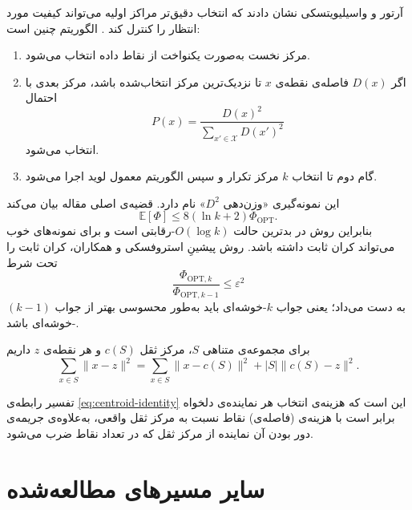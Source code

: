 آرتور و واسیلیویتسکی نشان دادند که انتخاب دقیق‌تر مراکز اولیه می‌تواند
کیفیت مورد انتظار  را کنترل کند \cite{arthur2007}. الگوریتم
 چنین است:
\begin{enumerate}
    \item مرکز نخست به‌صورت یکنواخت از نقاط داده انتخاب می‌شود.
    \item اگر $D(x)$ فاصله‌ی نقطه‌ی $x$ تا نزدیک‌ترین مرکز انتخاب‌شده باشد،
          مرکز بعدی با احتمال
          \begin{equation}
              P(x)=
              \frac{D(x)^2}{\sum_{x'\in\mathcal{X}}D(x')^2}
          \end{equation}
          انتخاب می‌شود.
    \item گام دوم تا انتخاب $k$ مرکز تکرار و سپس الگوریتم معمول لوید اجرا می‌شود.
\end{enumerate}
این نمونه‌گیری «وزن‌دهی $D^2$» نام دارد. قضیه‌ی اصلی مقاله بیان می‌کند
\begin{equation}
    \mathbb{E}[\Phi]\leq 8(\ln k+2)\Phi_{\mathrm{OPT}}.
    \label{eq:kpp-bound}
\end{equation}
بنابراین روش در بدترین حالت
$O(\log k)$-رقابتی است و برای نمونه‌های خوب می‌تواند کران ثابت
داشته باشد. روش پیشینِ استروفسکی و همکاران، کران ثابت را تحت شرط
\begin{equation}
    \frac{\Phi_{\mathrm{OPT},k}}
    {\Phi_{\mathrm{OPT},k-1}}\leq\varepsilon^2
\end{equation}
به دست می‌داد؛ یعنی جواب $k$-خوشه‌ای باید به‌طور محسوسی بهتر از جواب
$(k-1)$-خوشه‌ای باشد.

\begin{lemma}
    برای مجموعه‌ی متناهی $S$، مرکز ثقل $c(S)$ و هر نقطه‌ی $z$ داریم
    \begin{equation}
        \sum_{x\in S}\lVert x-z\rVert^2
        =
        \sum_{x\in S}\lVert x-c(S)\rVert^2
        +|S|\lVert c(S)-z\rVert^2.
        \label{eq:centroid-identity}
    \end{equation}
\end{lemma}

تفسیر رابطه‌ی \ref{eq:centroid-identity} این است که هزینه‌ی انتخاب هر
نماینده‌ی دلخواه برابر است با هزینه‌ی (فاصله‌ی) نقاط نسبت به مرکز ثقل واقعی،
به‌علاوه‌ی جریمه‌ی دور بودن آن نماینده از مرکز ثقل که در تعداد نقاط ضرب
می‌شود. 
\section{سایر مسیرهای مطالعه‌شده}

